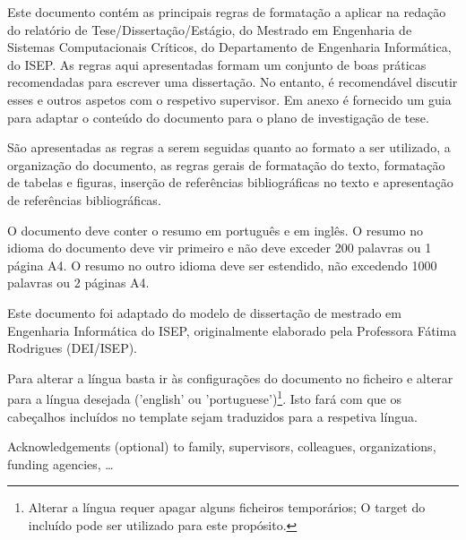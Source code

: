 \begin{abstractotherlanguage}

Este documento contém as principais regras de formatação a aplicar na redação do relatório de Tese/Dissertação/Estágio, do Mestrado em Engenharia de Sistemas Computacionais Críticos, do Departamento de Engenharia Informática, do ISEP. As regras aqui apresentadas formam um conjunto de boas práticas recomendadas para escrever uma dissertação. No entanto, é recomendável discutir esses e outros aspetos com o respetivo supervisor. Em anexo é fornecido um guia para adaptar o conteúdo do documento para o plano de investigação de tese.

São apresentadas as regras a serem seguidas quanto ao formato a ser utilizado, a organização do documento, as regras gerais de formatação do texto, formatação de tabelas e figuras, inserção de referências bibliográficas no texto e apresentação de referências bibliográficas.

O documento deve conter o resumo em português e em inglês. O resumo no idioma do documento deve vir primeiro e não deve exceder 200 palavras ou 1 página A4. O resumo no outro idioma deve ser estendido, não excedendo 1000 palavras ou 2 páginas A4.

Este documento foi adaptado do modelo de dissertação de mestrado em Engenharia Informática do ISEP, originalmente elaborado pela Professora Fátima Rodrigues (DEI/ISEP).

Para alterar a língua basta ir às configurações do documento no ficheiro  e alterar para a língua desejada ('english' ou 'portuguese')\footnote{Alterar a língua requer apagar alguns ficheiros temporários; O target  do  incluído pode ser utilizado para este propósito.}. Isto fará com que os cabeçalhos incluídos no template sejam traduzidos para a respetiva língua.

\end{abstractotherlanguage}



\begin{acknowledgements}

Acknowledgements (optional) to family, supervisors, colleagues, organizations, funding agencies, …

\end{acknowledgements}


